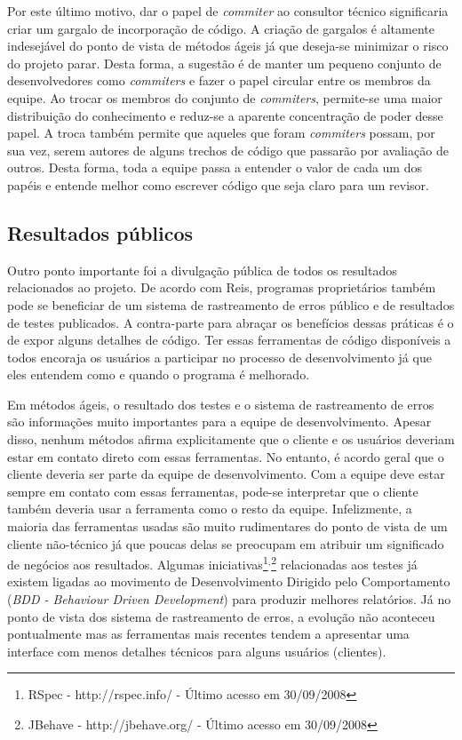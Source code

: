 Por este último motivo, dar o papel de \emph{commiter} ao consultor
técnico significaria criar um gargalo de incorporação de código. A
criação de gargalos é altamente indesejável do ponto de vista de
métodos ágeis já que deseja-se minimizar o risco do projeto
parar. Desta forma, a sugestão é de manter um pequeno conjunto de
desenvolvedores como \emph{commiters} e fazer o papel circular entre
os membros da equipe. Ao trocar os membros do conjunto de
\emph{commiters}, permite-se uma maior distribuição do conhecimento e
reduz-se a aparente concentração de poder desse papel. A troca também
permite que aqueles que foram \emph{commiters} possam, por sua vez,
serem autores de alguns trechos de código que passarão por avaliação
de outros. Desta forma, toda a equipe passa a entender o valor de cada
um dos papéis e entende melhor como escrever código que seja claro
para um revisor.

\subsection{Resultados públicos}
\label{subsec:publicity}

Outro ponto importante foi a divulgação pública de todos os resultados
relacionados ao projeto. De acordo com Reis, programas proprietários
também pode se beneficiar de um sistema de rastreamento de erros
público e de resultados de testes publicados. A contra-parte para
abraçar os benefícios dessas práticas é o de expor alguns detalhes de
código. Ter essas ferramentas de código disponíveis a todos encoraja
os usuários a participar no processo de desenvolvimento já que eles
entendem como e quando o programa é melhorado.

Em métodos ágeis, o resultado dos testes e o sistema de rastreamento
de erros são informações muito importantes para a equipe de
desenvolvimento. Apesar disso, nenhum métodos afirma explicitamente
que o cliente e os usuários deveriam estar em contato direto com essas
ferramentas. No entanto, é acordo geral que o cliente deveria ser
parte da equipe de desenvolvimento. Com a equipe deve estar sempre em
contato com essas ferramentas, pode-se interpretar que o cliente
também deveria usar a ferramenta como o resto da equipe. Infelizmente,
a maioria das ferramentas usadas são muito rudimentares do ponto de
vista de um cliente não-técnico já que poucas delas se preocupam em
atribuir um significado de negócios aos resultados. Algumas
iniciativas\footnote{RSpec - http://rspec.info/ - Último acesso em
  30/09/2008}$^{, }$\footnote{JBehave - http://jbehave.org/ - Último
  acesso em 30/09/2008} relacionadas aos testes já existem ligadas ao
movimento de Desenvolvimento Dirigido pelo Comportamento (\emph{BDD -
  Behaviour Driven Development}) \cite{North2006} para produzir
melhores relatórios. Já no ponto de vista dos sistema de rastreamento
de erros, a evolução não aconteceu pontualmente mas as ferramentas
mais recentes tendem a apresentar uma interface com menos detalhes
técnicos para alguns usuários (clientes).

